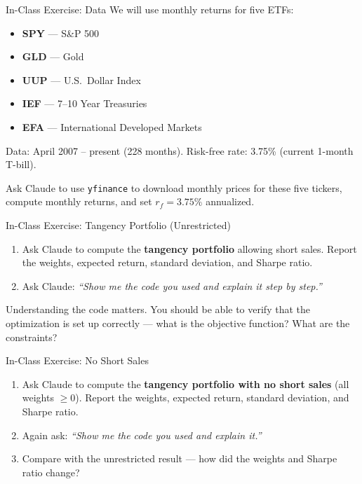 \documentclass[aspectratio=169]{beamer}
\begin{document}
\begin{frame}{In-Class Exercise: Data}
We will use monthly returns for five ETFs:
\vspace{0.2cm}
\begin{itemize}
  \item \textbf{SPY} --- S\&P 500
  \item \textbf{GLD} --- Gold
  \item \textbf{UUP} --- U.S.\ Dollar Index
  \item \textbf{IEF} --- 7--10 Year Treasuries
  \item \textbf{EFA} --- International Developed Markets
\end{itemize}
\vspace{0.2cm}
Data: April 2007 -- present (228 months).  Risk-free rate: 3.75\% (current 1-month T-bill).
\vspace{0.3cm}

Ask Claude to use \texttt{yfinance} to download monthly prices for these five tickers, compute monthly returns, and set $r_f = 3.75\%$ annualized.
\end{frame}

\begin{frame}{In-Class Exercise: Tangency Portfolio (Unrestricted)}
\begin{enumerate}
  \item Ask Claude to compute the \textbf{tangency portfolio} allowing short sales.  Report the weights, expected return, standard deviation, and Sharpe ratio.
  \item Ask Claude: \textit{``Show me the code you used and explain it step by step.''}
\end{enumerate}
\vspace{0.3cm}
\alert{Understanding the code matters.}  You should be able to verify that the optimization is set up correctly --- what is the objective function?  What are the constraints?
\end{frame}

\begin{frame}{In-Class Exercise: No Short Sales}
\begin{enumerate}
  \item Ask Claude to compute the \textbf{tangency portfolio with no short sales} (all weights $\geq 0$).  Report the weights, expected return, standard deviation, and Sharpe ratio.
  \item Again ask: \textit{``Show me the code you used and explain it.''}
  \item Compare with the unrestricted result --- how did the weights and Sharpe ratio change?
\end{enumerate}
\end{frame}
\end{document}

